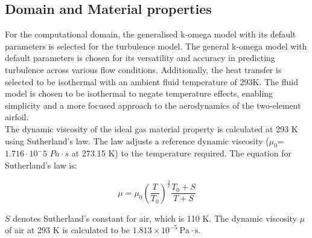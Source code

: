 \subsection{Domain and Material properties}
For the computational domain, the generalised k-omega model with its default parameters is selected for the turbulence model. The general k-omega model with default parameters is chosen for its versatility and accuracy in predicting turbulence across various flow conditions. Additionally, the heat transfer is selected to be isothermal with an ambient fluid temperature of 293K. The fluid model is chosen to be isothermal to negate temperature effects, enabling simplicity and a more focused approach to the aerodynamics of the two-element airfoil.\\

The dynamic viscosity of the ideal gas material property is calculated at 293 K using Sutherland's law. The law adjusts a reference dynamic viscosity ($\mu_0$= $1.716\cdot10^-5$ $Pa\cdot s$ at 273.15 K) to the temperature required. The equation for Sutherland's law is:

\begin{equation}
    \mu = \mu_0 \left( \frac{T}{T_0} \right)^{\frac{3}{2}} \frac{T_0 + S}{T + S}
\end{equation}

$S$ denotes Sutherland's constant for air, which is 110 K. The dynamic viscosity $\mu$ of air at 293 K is calculated to be $1.813 \times 10^{-5} \ \text{Pa}\cdot \text{s}$.




